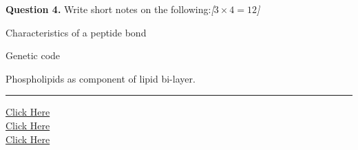 \documentclass[11pt,a4paper]{article}
\newcommand{\pts}[1]{\hfill   \textit{[#1]}}
\begin{document}
\medskip


\noindent   \textbf{Question 4.} Write short notes on the following:\pts{$3  \times 4 = 12$}

\begin{parts}
  \item Characteristics of a peptide bond
  \item Genetic code
  \item Phospholipids as component of lipid bi-layer.
\end{parts}

\vfill
\rule{\linewidth}{0.4pt}

\begin{center}\small
\href{https://bhu-exam.vercel.app/}{Click Here}\\[4pt]\href{https://me-aryan.vercel.app/}{Click Here}\\[4pt]\href{https://quashan-me.vercel.app/}{Click Here}
\end{center}
\end{document}
